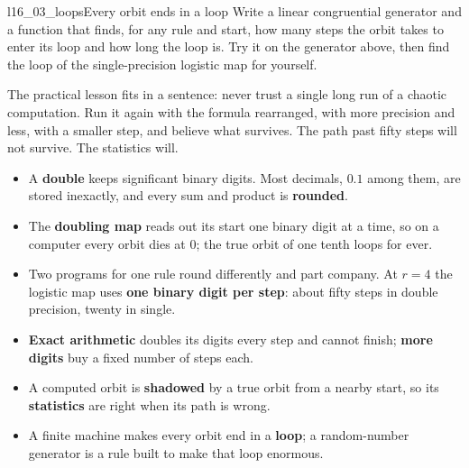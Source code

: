 \begin{lab}{l16_03_loops}{Every orbit ends in a loop}
Write a linear congruential generator and a function that finds, for any
rule and start, how many steps the orbit takes to enter its loop and how long
the loop is. Try it on the generator above, then find the loop of the
single-precision logistic map for yourself.
\end{lab}

\noindent
The practical lesson fits in a sentence: never trust a single long run of a
chaotic computation. Run it again with the formula rearranged, with more
precision and less, with a smaller step, and believe what survives. The path
past fifty steps will not survive. The statistics will.

\begin{summarybox}
\begin{itemize}
\item A \textbf{double} keeps  significant binary
  digits. Most decimals, $\num{0.1}$ among them, are stored inexactly, and
  every sum and product is \textbf{rounded}.
\item The \textbf{doubling map} reads out its start one binary digit at a
  time, so on a computer every orbit dies at $0$; the true orbit of one tenth
  loops for ever.
\item Two programs for one rule round differently and part company. At
  $r = 4$ the logistic map uses \textbf{one binary digit per step}: about
  fifty steps in double precision, twenty in single.
\item \textbf{Exact arithmetic} doubles its digits every step and cannot
  finish; \textbf{more digits} buy a fixed number of steps each.
\item A computed orbit is \textbf{shadowed} by a true orbit from a nearby
  start, so its \textbf{statistics} are right when its path is wrong.
\item A finite machine makes every orbit end in a \textbf{loop}; a
  random-number generator is a rule built to make that loop enormous.
\end{itemize}
\end{summarybox}

\canyou

